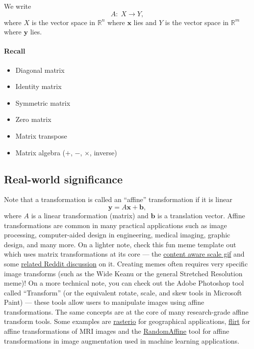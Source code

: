 We write
\[
A:\; X \to Y,
\]
where $X$ is the vector space in $\mathbb{R}^n$ where $\mathbf{x}$ lies and $Y$ is the vector space in $\mathbb{R}^m$ where $\mathbf{y}$ lies.

\paragraph{Recall}
\begin{itemize}
  \item Diagonal matrix
  \item Identity matrix
  \item Symmetric matrix
  \item Zero matrix
  \item Matrix transpose
  \item Matrix algebra ($+$, $-$, $\times$, inverse)
\end{itemize}
\subsection{Real-world significance}
Note that a transformation is called an ``affine'' transformation if it is linear
\[
\mathbf{y} = A\mathbf{x} + \mathbf{b},
\]
where $A$ is a linear transformation (matrix) and $\mathbf{b}$ is a translation vector. Affine transformations are common in many practical applications such as image processing, computer-aided design in engineering, medical imaging, graphic design, and many more. On a lighter note, check this fun meme template out which uses matrix transformations at its core --- the \href{https://www.youtube.com/watch?v=hYdmPw-SrMQ}{content aware scale gif} and some \href{https://www.reddit.com/r/davinciresolve/comments/1780z24/how\_to\_do\_content\_aware\_scale\_meme\_effect\_for/}{related Reddit discussion} on it. Creating memes often requires very specific image transforms (such as the Wide Keanu or the general Stretched Resolution meme)! On a more technical note, you can check out the Adobe Photoshop tool called ``Transform'' (or the equivalent rotate, scale, and skew tools in Microsoft Paint) --- these tools allow users to manipulate images using affine transformations. The same concepts are at the core of many research-grade affine transform tools. Some examples are \href{https://affine.readthedocs.io/en/latest/index.html#}{rasterio} for geographical applications, \href{https://open.win.ox.ac.uk/pages/fsl/fslpy/_modules/fsl/transform/flirt.html}{flirt} for affine transformations of MRI images and the \href{https://pytorch.org/vision/stable/transforms.html#torchvision.transforms.RandomAffine}{RandomAffine} tool for affine transformations in image augmentation used in machine learning applications.

